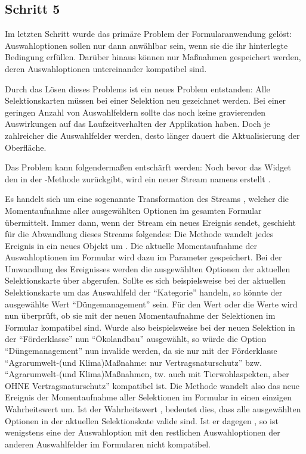 \ifincludeall \clearpage \fi

\subsection{Schritt 5}

Im letzten Schritt wurde das primäre Problem der Formularanwendung gelöst:
Auswahloptionen sollen nur dann anwählbar sein,
wenn sie die ihr hinterlegte Bedingung erfüllen.
Darüber hinaus können nur Maßnahmen gespeichert werden,
deren Auswahloptionen untereinander kompatibel sind.

Durch das Lösen dieses Problems ist ein neues Problem entstanden:
Alle Selektionskarten müssen bei einer Selektion neu gezeichnet werden.
Bei einer geringen Anzahl von Auswahlfeldern sollte das noch keine gravierenden Auswirkungen auf das Laufzeitverhalten der Applikation haben.
Doch je zahlreicher die Auswahlfelder werden,
desto länger dauert die Aktualisierung der Oberfläche.

Das Problem kann folgendermaßen entschärft werden:
Noch bevor das Widget  den  in der -Methode zurückgibt,
wird ein neuer Stream namens  erstellt .

Es handelt sich um eine sogenannte Transformation des Streams , welcher die Momentaufnahme aller ausgewählten Optionen im gesamten Formular übermittelt.
Immer dann, wenn der Stream  ein neues Ereignis sendet,
geschieht für die Abwandlung dieses Streams folgendes:
Die Methode  wandelt jedes Ereignis in ein neues Objekt um .
Die aktuelle Momentaufnahme der Auswahloptionen im Formular wird dazu im Parameter  gespeichert.
Bei der Umwandlung des Ereignisses werden die ausgewählten Optionen der aktuellen Selektionskarte über  abgerufen.
Sollte es sich beispielsweise bei der aktuellen Selektionskarte um das Auswahlfeld der \enquote{Kategorie} handeln,
so könnte der ausgewählte Wert \enquote{Düngemanagement} sein.
Für den Wert oder die Werte wird nun überprüft, ob sie mit der neuen Momentaufnahme der Selektionen im Formular kompatibel sind.
Wurde also beispielsweise bei der neuen Selektion in der \enquote{Förderklasse} nun \enquote{Ökolandbau} ausgewählt,
so würde die Option \enquote{Düngemanagement} nun invalide werden,
da sie nur mit der Förderklasse \enquote{Agrarumwelt-(und Klima)Maßnahme: nur Vertragsnaturschutz} bzw. \enquote{Agrarumwelt-(und Klima)Maßnahmen, tw. auch mit Tierwohlaspekten, aber OHNE Vertragsnaturschutz} kompatibel ist.
Die Methode  wandelt also das neue Ereignis der Momentaufnahme aller Selektionen im Formular in einen einzigen Wahrheitswert um.
Ist der Wahrheitswert ,
bedeutet dies,
dass alle ausgewählten Optionen in der aktuellen Selektionskate valide sind.
Ist er dagegen , so ist wenigstens eine der Auswahloption mit den restlichen Auswahloptionen der anderen Auswahlfelder im Formularen nicht kompatibel.

